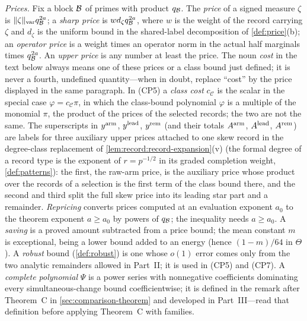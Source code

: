 \emph{Prices.}
Fix a block $\mathcal B$ of primes with product $q_{\mathcal B}$. The
\emph{price} of a signed measure $\zeta$ is
$\|\zeta\|_{\mathrm{var}}q_{\mathcal B}^{2a}$; a \emph{sharp price} is
$wd_\zeta q_{\mathcal B}^{2a}$, where $w$ is the weight of the record
carrying $\zeta$ and $d_\zeta$ is the uniform bound in the
shared-label decomposition of \cref{def:price}(b); an \emph{operator
price} is a weight times an operator norm in the actual half
marginals times $q_{\mathcal B}^{2a}$. An \emph{upper price} is any number
at least the price. The noun \emph{cost} in the text below always
means one of these prices or a class bound just defined; it is
never a fourth, undefined quantity---when in doubt, replace
``cost'' by the price displayed in the same paragraph. In (CP5) a
\emph{class cost}
$c_{\mathcal C}$ is the scalar in the special case
$\varphi=c_{\mathcal C}\pi$, in which the class-bound
polynomial $\varphi$ is a multiple of the monomial $\pi$, the
product of the prices of the selected records; the two are not
the same. The superscripts in $y^{\rm arm}$, $y^{\rm lead}$,
$y^{\rm rem}$ (and their totals $A^{\rm arm}$, $A^{\rm lead}$,
$A^{\rm rem}$) are labels for three auxiliary upper prices attached
to one skew record in the degree-class replacement of
\cref{lem:record:record-expansion}(v) (the formal degree of a
record type is the exponent of $r=p^{-1/2}$ in its graded
completion weight, \cref{def:patterns}): the first, the raw-arm
price, is the auxiliary price whose product over the records of a
selection is the first term of the class bound there, and the second
and third split the full skew price into its leading star part
and a remainder. \emph{Repricing} converts prices computed at an evaluation
exponent $a_0$ to the theorem exponent $a\ge a_0$ by powers of
$q_{\mathcal B}$; the inequality needs $a\ge a_0$. A \emph{saving} is a
proved amount subtracted from a price bound; the mean constant $m$
is exceptional, being a lower bound added to an energy (hence
$(1-m)/64$ in $\Theta$). A \emph{robust} bound
(\cref{def:robust}) is one whose $o(1)$ error comes only from the
two analytic remainders allowed in Part~II; it is used in (CP5) and
(CP7). A \emph{complete polynomial} $\Psi$ is a power series with
nonnegative coefficients dominating every simultaneous-change bound
coefficientwise; it is defined in the remark after Theorem~C in
\cref{sec:comparison-theorem} and developed in Part~III---read that
definition before applying Theorem~C with families.


